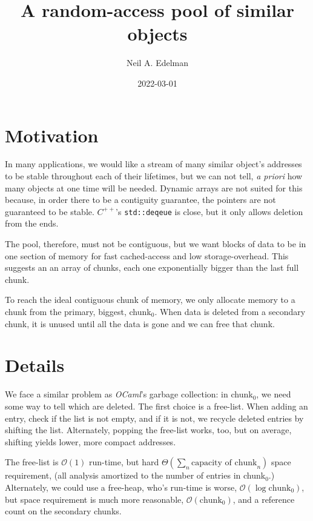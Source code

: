 \documentclass[12pt]{article}
\author{Neil A. Edelman}
\title{A random-access pool of similar objects}
\date{2022-03-01}
\newcommand{\code}[1]{\colorbox{light-gray}{\texttt{#1}}}
\begin{document}
\maketitle


\section{Motivation}

In many applications, we would like a stream of many similar object's addresses to be stable throughout each of their lifetimes, but we can not tell, {\it a priori} how many objects at one time will be needed. Dynamic arrays are not suited for this because, in order there to be a contiguity guarantee, the pointers are not guaranteed to be stable. $C^{++}$'s \code{std::deqeue} is close, but it only allows deletion from the ends.

The pool, therefore, must not be contiguous, but we want blocks of data to be in one section of memory for fast cached-access and low storage-overhead. This suggests an an array of chunks, each one exponentially bigger than the last full chunk.

To reach the ideal contiguous chunk of memory, we only allocate memory to a chunk from the primary, biggest, chunk$_0$. When data is deleted from a secondary chunk, it is unused until all the data is gone and we can free that chunk.

\section{Details}

We face a similar problem as {\it OCaml}'s garbage collection: in chunk$_0$, we need some way to tell which are deleted. The first choice is a free-list. When adding an entry, check if the list is not empty, and if it is not, we recycle deleted entries by shifting the list. Alternately, popping the free-list works, too, but on average, shifting yields lower, more compact addresses.

The free-list is $\mathcal{O}(1)$ run-time, but hard $\Theta(\sum_n\text{capacity of chunk}_n)$\cite{knuth1976big} space requirement, (all analysis amortized to the number of entries in chunk$_0$.) Alternately, we could use a free-heap, who's run-time is worse, $\mathcal{O}(\log \text{chunk}_0)$, but space requirement is much more reasonable, $\mathcal{O}(\text{chunk}_0)$, and a reference count on the secondary chunks.
\end{document}
